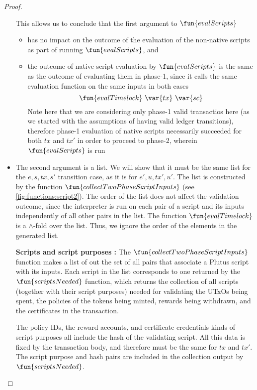 \begin{property}
\begin{proof}
\begin{itemize}
    This allows us to conclude that the first argument to $\fun{evalScripts}$
    \begin{itemize}
      \item has no impact on the outcome of the evaluation of the non-native scripts
      as part of running $\fun{evalScripts}$, and
      \item the outcome of native script evaluation by $\fun{evalScripts}$ is the
      same as the outcome of evaluating them in phase-1, since
      it calls the same evaluation function on the same inputs in both cases
      \[\fun{evalTimelock}~\var{tx}~\var{sc}\]
      Note here that we are considering only phase-1 valid transactios here (as we started
      with the assumptions of having valid ledger transitions), therefore
      phase-1 evaluation of native scripts necessarily succeeded for both $tx$ and $tx'$
      in order to proceed to phase-2, wherein $\fun{evalScripts}$ is run
    \end{itemize}

    \item The second argument is a list. We will show that it must be the same list for the $e, s, tx, s'$
    transition case, as it is for $e', u, tx', u'$. The list is constructed by the
    function $\fun{collectTwoPhaseScriptInputs}$ (see \ref{fig:functions:script2}).
    The order of the list does not affect the validation outcome, since the interpreter is run
    on each pair of a script and its inputs independently of all other pairs in the list.
    The function $\fun{evalTimelock}$ is a $\wedge$-fold over the list. Thus, we ignore the order
    of the elements in the generated list.

    \textbf{Scripts and script purposes : } The $\fun{collectTwoPhaseScriptInputs}$
    function makes a list of out the set of all pairs that associate a Plutus script
    with its inputs. Each script in the list corresponds to one returned by
    the $\fun{scriptsNeeded}$ function, which returns the collection of
    all scripts (together with their script purposes) needed for validating the UTxOs being spent,
    the policies of the tokens being minted, rewards being withdrawn, and the certificates
    in the transaction.

    The policy IDs, the reward accounts, and certificate credentials kinds of script purposes all include
    the hash of the validating script. All this data is fixed by the transaction body,
    and therefore must be the same for $tx$ and $tx'$. The script purpose and hash pairs are
    included in the collection output by $\fun{scriptsNeeded}$.


\end{itemize}
\end{proof}
\end{property}
